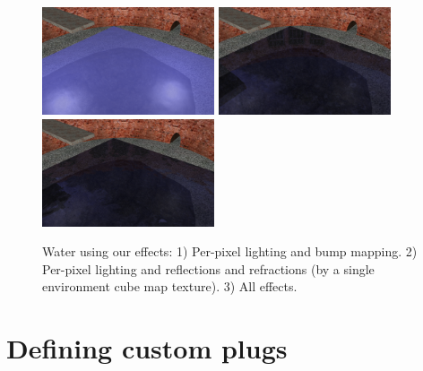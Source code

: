 \documentclass{egpubl}
\begin{document}


\setcounter{figure}{7}
\begin{figure}[b]
  \centering
  \includegraphics[width=2.0in]{water_shaders_1}
  \includegraphics[width=2.0in]{water_shaders_2}
  \includegraphics[width=2.0in]{water_shaders_3}
  \caption{Water using our effects: 1) Per-pixel lighting and bump mapping.
2) Per-pixel lighting and reflections and refractions (by a single environment cube map texture).
3) All effects.}
  \label{fig_water}
\end{figure}
\setcounter{figure}{5}

\section{Defining custom plugs}
\end{document}
